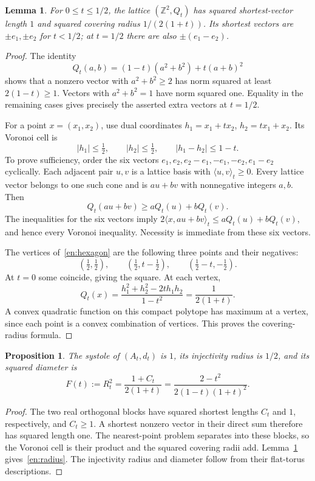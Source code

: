 \documentclass[12pt]{amsart}
\newcommand{\PropositionName}{Proposition}
\newcommand{\LemmaName}{Lemma}
\newtheorem{prop}[thm]{\PropositionName}
\newtheorem{lem}[thm]{\LemmaName}
\theoremstyle{definition}
\theoremstyle{remark}
\numberwithin{equation}{section}
\newcommand{\Z}{\mathbb{Z}}
\begin{document}
\begin{lem}\label{en:rhombus}
For $0\leq t\leq1/2$, the lattice $(\Z^2,Q_t)$ has squared shortest-vector length $1$ and squared covering radius $1/(2(1+t))$. Its shortest vectors are $\pm e_1,\pm e_2$ for $t<1/2$; at $t=1/2$ there are also $\pm(e_1-e_2)$.
\end{lem}
\begin{proof}
The identity
\[
Q_t(a,b)=(1-t)(a^2+b^2)+t(a+b)^2
\]
shows that a nonzero vector with $a^2+b^2\geq2$ has norm squared at least $2(1-t)\geq1$. Vectors with $a^2+b^2=1$ have norm squared one. Equality in the remaining cases gives precisely the asserted extra vectors at $t=1/2$.

For a point $x=(x_1,x_2)$, use dual coordinates
$h_1=x_1+tx_2$, $h_2=tx_1+x_2$.
Its Voronoi cell is
\begin{equation}\label{en:hexagon}
|h_1|\leq\tfrac12,\qquad |h_2|\leq\tfrac12,
\qquad |h_1-h_2|\leq1-t.
\end{equation}
To prove sufficiency, order the six vectors
$e_1,e_2,e_2-e_1,-e_1,-e_2,e_1-e_2$ cyclically.
Each adjacent pair $u,v$ is a lattice basis with $\langle u,v\rangle_t\geq0$.
Every lattice vector belongs to one such cone and is $au+bv$ with nonnegative integers $a,b$. Then
\[
Q_t(au+bv)\geq aQ_t(u)+bQ_t(v).
\]
The inequalities for the six vectors imply
$2\langle x,au+bv\rangle_t\leq aQ_t(u)+bQ_t(v)$, and hence every Voronoi inequality. Necessity is immediate from these six vectors.

The vertices of~\eqref{en:hexagon} are the following three points and their negatives:
\[
(\tfrac12,\tfrac12),\qquad
(\tfrac12,t-\tfrac12),\qquad
(\tfrac12-t,-\tfrac12).
\]
At $t=0$ some coincide, giving the square. At each vertex,
\[
Q_t(x)=\frac{h_1^2+h_2^2-2th_1h_2}{1-t^2}
=\frac1{2(1+t)}.
\]
A convex quadratic function on this compact polytope has maximum at a vertex, since each point is a convex combination of vertices. This proves the covering-radius formula.
\end{proof}

\begin{prop}\label{en:radii}
The systole of $(A_t,d_t)$ is $1$, its injectivity radius is $1/2$, and its squared diameter is
\begin{equation}\label{en:radius}
F(t):=R_t^2=\frac{1+C_t}{2(1+t)}
=\frac{2-t^2}{2(1-t)(1+t)^2}.
\end{equation}
\end{prop}
\begin{proof}
The two real orthogonal blocks have squared shortest lengths $C_t$ and $1$, respectively, and $C_t\geq1$. A shortest nonzero vector in their direct sum therefore has squared length one. The nearest-point problem separates into these blocks, so the Voronoi cell is their product and the squared covering radii add. Lemma~\ref{en:rhombus} gives~\eqref{en:radius}. The injectivity radius and diameter follow from their flat-torus descriptions.
\end{proof}
\end{document}
